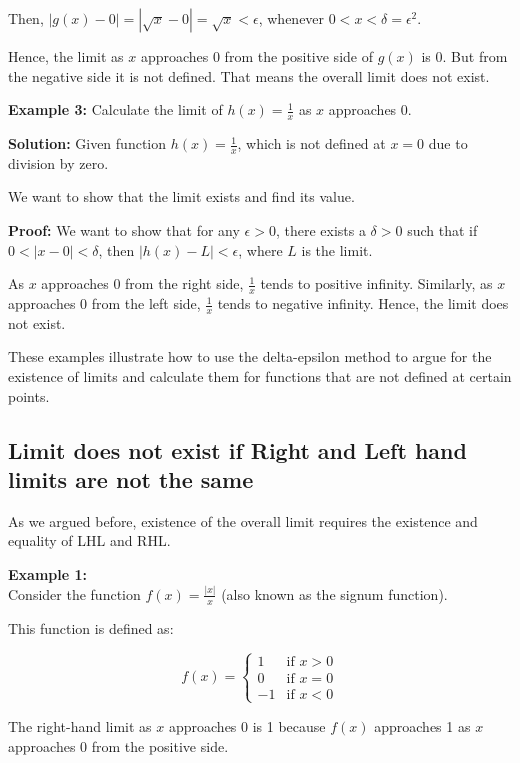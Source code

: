 Then, $|g(x) - 0| = |\sqrt{x} - 0| = \sqrt{x} < \epsilon$, whenever $0 < x < \delta = \epsilon^2$.

Hence, the limit as $x$ approaches 0 from the positive side of $g(x)$ is 0. But from the negative side it is not defined. That means the overall limit does not exist.

\textbf{Example 3:}
Calculate the limit of $h(x) = \frac{1}{x}$ as $x$ approaches 0.

\textbf{Solution:}
Given function $h(x) = \frac{1}{x}$, which is not defined at $x = 0$ due to division by zero.

We want to show that the limit exists and find its value.

\textbf{Proof:} 
We want to show that for any $\epsilon > 0$, there exists a $\delta > 0$ such that if $0 < |x - 0| < \delta$, then $|h(x) - L| < \epsilon$, where $L$ is the limit.

As $x$ approaches 0 from the right side, $\frac{1}{x}$ tends to positive infinity. Similarly, as $x$ approaches 0 from the left side, $\frac{1}{x}$ tends to negative infinity. Hence, the limit does not exist.

These examples illustrate how to use the delta-epsilon method to argue for the existence of limits and calculate them for functions that are not defined at certain points.




\subsection{Limit does not exist if Right and Left hand limits are not the same}

As we argued before, existence of the overall limit requires the existence and equality of LHL and RHL.

\textbf{Example 1:} \\
Consider the function $f(x) = \frac{|x|}{x}$ (also known as the signum function).

This function is defined as:

\[ f(x) = \begin{cases} 
1 & \text{if } x > 0 \\
0 & \text{if } x = 0 \\
-1 & \text{if } x < 0 
\end{cases} \]

The right-hand limit as $x$ approaches 0 is 1 because $f(x)$ approaches 1 as $x$ approaches 0 from the positive side.

